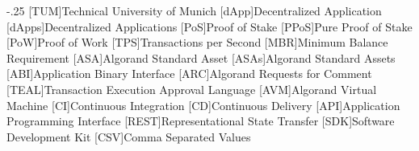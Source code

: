 \documentclass[headsepline,footsepline,footinclude=false,oneside,fontsize=11pt,paper=a4,listof=totoc,bibliography=totoc,parskip=half]{scrbook} %
\begin{document}


\frontmatter{}





\tableofcontents{}

\mainmatter{}








\appendix{}


\begin{acronym}
    \itemsep-.25\baselineskip
    [TUM]{Technical University of Munich}
    [dApp]{Decentralized Application}
    [dApps]{Decentralized Applications}
    [PoS]{Proof of Stake}
    [PPoS]{Pure Proof of Stake}
    [PoW]{Proof of Work}
    [TPS]{Transactions per Second}
    [MBR]{Minimum Balance Requirement}
    [ASA]{Algorand Standard Asset}
    [ASAs]{Algorand Standard Assets}
    [ABI]{Application Binary Interface}
    [ARC]{Algorand Requests for Comment}
    [TEAL]{Transaction Execution Approval Language}
    [AVM]{Algorand Virtual Machine}
    [CI]{Continuous Integration}
    [CD]{Continuous Delivery}
    [API]{Application Programming Interface}
    [REST]{Representational State Transfer}
    [SDK]{Software Development Kit}
    [CSV]{Comma Separated Values}
\end{acronym}

\listoffigures{}
\listoftables{}
\printbibliography{}
\end{document}
